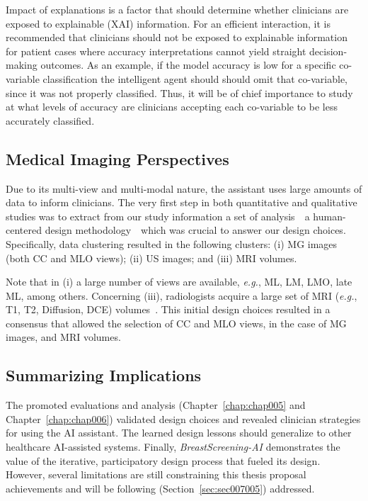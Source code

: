 Impact of explanations is a factor that should determine whether clinicians are exposed to explainable (\ac{XAI}) information.
For an efficient interaction, it is recommended that clinicians should not be exposed to explainable information for patient cases where accuracy interpretations cannot yield straight decision-making outcomes.
As an example, if the model accuracy is low for a specific co-variable classification the intelligent agent should should omit that co-variable, since it was not properly classified.
Thus, it will be of chief importance to study at what levels of accuracy are clinicians accepting each co-variable to be less accurately classified.

\subsection{Medical Imaging Perspectives}
\label{sec:sec007004004}

Due to its multi-view and multi-modal nature, the assistant uses large amounts of data to inform clinicians.
The very first step in both quantitative and qualitative studies was to extract from our study information a set of analysis~\textendash~a human-centered design methodology~\textendash~which was crucial to answer our design choices.
Specifically, data clustering resulted in the following clusters:
(i) \ac{MG} images (both \ac{CC} and \ac{MLO} views);
(ii) \ac{US} images; and
(iii) \ac{MRI} volumes.

Note that in (i) a large number of views are available, {\it e.g.}, ML, LM, LMO, late ML, among others.
Concerning (iii), radiologists acquire a large set of \ac{MRI} ({\it e.g.}, T1, T2, Diffusion, \acl{DCE}) volumes~\cite{seifabadi2019correlation}.
This initial design choices resulted in a consensus that allowed the selection of \ac{CC} and \ac{MLO} views, in the case of \ac{MG} images, and \ac{MRI} volumes.

\subsection{Summarizing Implications}
\label{sec:sec007004005}

The promoted evaluations and analysis (Chapter~\ref{chap:chap005} and Chapter~\ref{chap:chap006}) validated design choices and revealed clinician strategies for using the \ac{AI} assistant.
The learned design lessons should generalize to other healthcare \ac{AI}-assisted systems.
Finally, {\it BreastScreening-AI} demonstrates the value of the iterative, participatory design process that fueled its design.
However, several limitations are still constraining this thesis proposal achievements and will be following (Section~\ref{sec:sec007005}) addressed.

